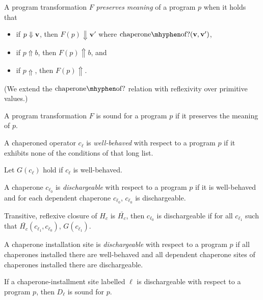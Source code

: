 \begin{definition}
A program transformation $F$ \emph{preserves meaning} of a program $p$ when it holds that
\begin{itemize}
\item if $p\Downarrow\mathbf{v}$, then $F(p)\Downarrow\mathbf{v'}$ where $\mathrm{chaperone\mhyphen of?}(\vv,\vvp)$,
\item if $p\Uparrow b$, then $F(p)\Uparrow b$, and
\item if $p\Uparrow$, then $F(p)\Uparrow$.
\end{itemize}
\end{definition}

(We extend the $\mathrm{chaperone\mhyphen of?}$ relation with reflexivity over primitive values.)

\begin{definition}
A program transformation $F$ is sound for a program $p$ if it preserves the meaning of $p$.
\end{definition}

\begin{definition}
A chaperoned operator $c_\ell$ is \emph{well-behaved} with respect to a program $p$ if it exhibits none of the conditions of that long list.
\end{definition}

Let $G(c_\ell)$ hold if $c_\ell$ is well-behaved.

\begin{definition}
A chaperone $c_{\ell_0}$ is \emph{dischargeable} with respect to a program $p$ if it is well-behaved and for each dependent chaperone $c_{\ell_0}$, $c_{\ell_0}$ is dischargeable.
\end{definition}

Transitive, reflexive closure of $H_c$ is $\bar{H_c}$,
then $c_{\ell_0}$ is dischargeable if for all $c_{\ell_1}$ such that $\bar{H_c}(c_{\ell_1},c_{\ell_0})$, $G(c_{\ell_1})$.

\begin{definition}
A chaperone installation site is \emph{dischargeable} with respect to a program $p$ if all chaperones installed there are well-behaved and all dependent chaperone sites of chaperones installed there are dischargeable.
\end{definition}

\begin{theorem}
If a chaperone-installment site labelled $\ell$ is dischargeable with respect to a program $p$, then $D_\ell$ is sound for $p$.
\end{theorem}

